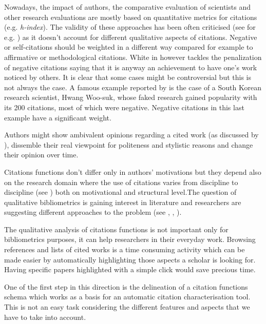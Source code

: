 \documentclass[runningheads,a4paper]{llncs}
\begin{document}
Nowadays, the impact of authors, the comparative evaluation of scientists and other research evaluations are mostly based on quantitative metrics for citations (e.g. {\em h-index}). The validity of these approaches has been often criticised (see for e.g.  \cite{__RefNumPara__3047_348126194}) as it doesn't account for different qualitative aspects of citations. Negative or self-citations should be weighted in a different way compared for example to affirmative or methodological citations. White in  \cite{__RefNumPara__3049_348126194} however tackles the penalization of negative citations saying that it is anyway an achievement to have one's work noticed by others. It is clear that some cases might be controversial but this is not always the case. A famous example reported by  \cite{__RefNumPara__3090_348126194} is the case of a South Korean research scientist, Hwang Woo-suk, whose faked research gained popularity with its 200 citations, most of which were negative. Negative citations in this last example have a significant weight.

Authors might show ambivalent opinions regarding a cited work (as discussed by  \cite{__RefNumPara__6442_348126194}), dissemble their real viewpoint for politeness and stylistic reasons and change their opinion over time.

Citations functions don't differ only in authors' motivations but they depend also on the research domain where the use of citations varies from discipline to discipline (see  \cite{__RefNumPara__3094_348126194}) both on motivational and structural level.The question of qualitative bibliometrics is gaining interest in literature and researchers are suggesting different approaches to the problem (see  \cite{__RefNumPara__3096_348126194},  \cite{__RefNumPara__3098_348126194},  \cite{__RefNumPara__3100_348126194}).

The qualitative analysis of citations functions is not important only for bibliometrics purposes, it can help researchers in their everyday work. Browsing references and lists of cited works is a time consuming activity which can be made easier by automatically highlighting those aspects a scholar is looking for. Having specific papers highlighted with a simple click would save precious time.

One of the first step in this direction is the delineation of a citation functions schema which works as a basis for an automatic citation characterisation tool. This is not an easy task considering the different features and aspects that we have to take into account.
\end{document}
